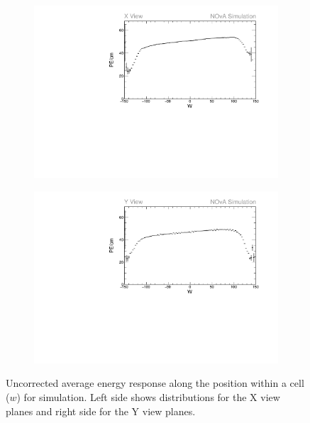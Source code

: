 \begin{figure}[h]
\centering
\begin{subfigure}[b]{0.495\textwidth}
\centering
\includegraphics[width=\textwidth]{Plots/TBCalibration/Attenprofs_Simulation_WPE_corr_xy_X_Prof.pdf}
\end{subfigure}
\begin{subfigure}[b]{0.495\textwidth}
\centering
\includegraphics[width=\textwidth]{Plots/TBCalibration/Attenprofs_Simulation_WPE_corr_xy_Y_Prof.pdf}
\end{subfigure}
\caption[Uncorrected energy response along the position within a cell for simulation]{Uncorrected average energy response along the position within a cell ($w$) for simulation. Left side shows distributions for the X view planes and right side for the Y view planes.}
\label{fig:CalibhistWPE_simulation}
\end{figure}

